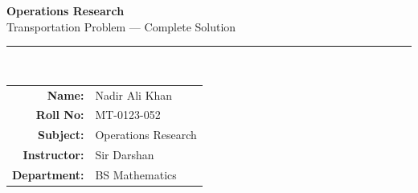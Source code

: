 \documentclass[12pt]{article}
\begin{document}
\thispagestyle{empty}

\begin{tcolorbox}[
  enhanced, arc=0pt, boxrule=0pt,
  colback=primary, colframe=primary,
  left=16pt, right=16pt, top=18pt, bottom=14pt,
  borderline south={4pt}{0pt}{accent},
]
  \centering
  {\huge\bfseries\color{white} Operations Research}\\[4pt]
  {\large\color{accent} Transportation Problem --- Complete Solution}\\[8pt]
  \color{lightbg}\rule{0.5\textwidth}{0.4pt}\\[8pt]
  \begin{tabular}{rl}
    {\color{lightbg}\textbf{Name:}}       & {\color{white} Nadir Ali Khan} \\[3pt]
    {\color{lightbg}\textbf{Roll No:}}    & {\color{white} MT-0123-052} \\[3pt]
    {\color{lightbg}\textbf{Subject:}}    & {\color{white} Operations Research} \\[3pt]
    {\color{lightbg}\textbf{Instructor:}} & {\color{white} Sir Darshan} \\[3pt]
    {\color{lightbg}\textbf{Department:}} & {\color{white} BS Mathematics} \\
  \end{tabular}
\end{tcolorbox}

\vspace{14pt}
\end{document}
